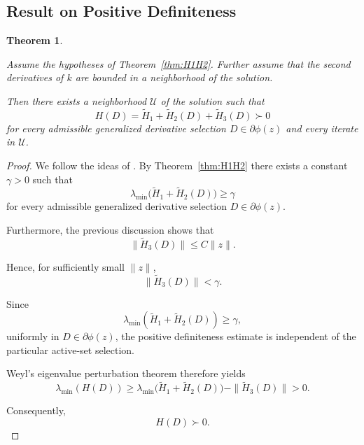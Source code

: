 \documentclass[11pt]{article}
\newtheorem{theorem}{Theorem}
\begin{document}
\subsection{Result on Positive Definiteness}

\begin{theorem}
\label{thm:fullhessian}

Assume the hypotheses of Theorem~\ref{thm:H1H2}.
Further assume that the second derivatives of $k$ are bounded in a neighborhood of the solution.

Then there exists a neighborhood $\mathcal U$ of the solution such that  
\[
H(D)
=
\tilde H_1+\tilde H_2(D)+\tilde H_3(D)
\succ0
\]
for every admissible generalized derivative selection
$D\in\partial\phi(z)$ and every iterate in $\mathcal U$.
\end{theorem}

\begin{proof}

We follow the ideas of \cite{walther2018equality}. 
By Theorem~\ref{thm:H1H2} there exists a constant
$\gamma>0$ such that
\[
\lambda_{\min} \bigl(\tilde H_1+\tilde H_2(D)
\bigr) \ge \gamma
\]
for every admissible generalized derivative selection
$D\in\partial\phi(z)$.

Furthermore, the previous discussion shows that
\[
\|\tilde H_3(D)\| \le C\|z\|.
\]

Hence, for sufficiently small $\|z\|$,
\[
\|\tilde H_3(D)\| < \gamma .
\]

Since
\[
\lambda_{\min}(\tilde H_1+\tilde H_2(D))
\ge \gamma,
\]
uniformly in $D\in\partial\phi(z)$, the positive definiteness estimate
is independent of the particular active-set selection.

Weyl's eigenvalue perturbation theorem therefore yields
\[
\lambda_{\min}(H(D)) \ge
\lambda_{\min}
\bigl(
\tilde H_1+\tilde H_2(D)
\bigr)
-
\|\tilde H_3(D)\|
>
0.
\]

Consequently,
\[
H(D)\succ0.
\]
\end{proof}



\end{document}
